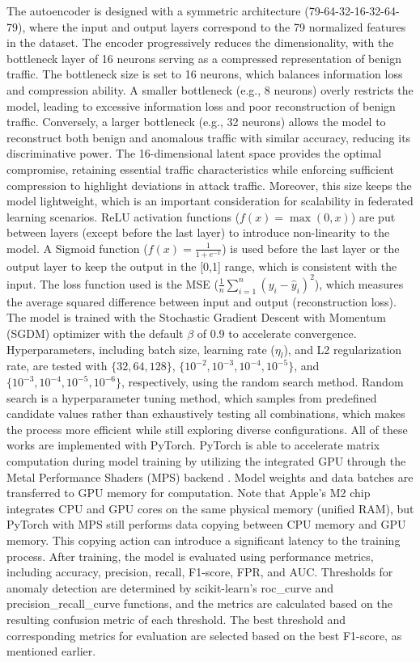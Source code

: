 The autoencoder is designed with a symmetric architecture (79-64-32-16-32-64-79), where the input and output layers correspond to the 79 normalized features in the dataset. The encoder progressively reduces the dimensionality, with the bottleneck layer of 16 neurons serving as a compressed representation of benign traffic. The bottleneck size is set to 16 neurons, which balances information loss and compression ability. A smaller bottleneck (e.g., 8 neurons) overly restricts the model, leading to excessive information loss and poor reconstruction of benign traffic. Conversely, a larger bottleneck (e.g., 32 neurons) allows the model to reconstruct both benign and anomalous traffic with similar accuracy, reducing its discriminative power. The 16-dimensional latent space provides the optimal compromise, retaining essential traffic characteristics while enforcing sufficient compression to highlight deviations in attack traffic. Moreover, this size keeps the model lightweight, which is an important consideration for scalability in federated learning scenarios. ReLU activation functions ($f(x) = \max(0, x)$) are put between layers (except before the last layer) to introduce non-linearity to the model. A Sigmoid function ($f(x) = \frac{1}{1 + e^{-x}}$) is used before the last layer or the output layer to keep the output in the [0,1] range, which is consistent with the input. The loss function used is the MSE ($\frac{1}{n} \sum_{i=1}^{n} \left( y_i - \hat{y}_i \right)^2$), which measures the average squared difference between input and output (reconstruction loss). The model is trained with the Stochastic Gradient Descent with Momentum (SGDM) optimizer with the default $\beta$ of 0.9 to accelerate convergence. Hyperparameters, including batch size, learning rate ($\eta_l$), and L2 regularization rate, are tested with $\{32, 64, 128\}$, $\{10^{-2}, 10^{-3}, 10^{-4}, 10^{-5}\}$, and $\{10^{-3}, 10^{-4}, 10^{-5}, 10^{-6}\}$, respectively, using the random search method. Random search is a hyperparameter tuning method, which samples from predefined candidate values rather than exhaustively testing all combinations, which makes the process more efficient while still exploring diverse configurations. All of these works are implemented with PyTorch. PyTorch is able to accelerate matrix computation during model training by utilizing the integrated GPU through the Metal Performance Shaders (MPS) backend \citep{mps}. Model weights and data batches are transferred to GPU memory for computation. Note that Apple's M2 chip integrates CPU and GPU cores on the same physical memory (unified RAM), but PyTorch with MPS still performs data copying between CPU memory and GPU memory. This copying action can introduce a significant latency to the training process. After training, the model is evaluated using performance metrics, including accuracy, precision, recall, F1-score, FPR, and AUC. Thresholds for anomaly detection are determined by scikit-learn’s roc\_curve \citep{sklearnrc} and precision\_recall\_curve \citep{sklearnprc} functions, and the metrics are calculated based on the resulting confusion metric of each threshold. The best threshold and corresponding metrics for evaluation are selected based on the best F1-score, as mentioned earlier.

